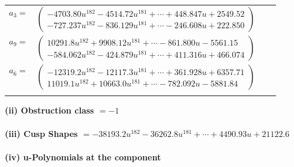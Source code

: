 \documentclass[1p]{elsarticle_modified}
\theoremstyle{definition}
\begin{document}
\begin{tabular}{m{7pt} m{180pt} m{7pt} m{180pt} }
\flushright $a_{3}=$&$\begin{pmatrix}-4703.80 u^{182}-4514.72 u^{181}+\cdots+448.847 u+2549.52\\-727.237 u^{182}-836.129 u^{181}+\cdots-246.608 u+222.850\end{pmatrix}$ \\
\flushright $a_{9}=$&$\begin{pmatrix}10291.8 u^{182}+9908.12 u^{181}+\cdots-861.800 u-5561.15\\-584.062 u^{182}-424.879 u^{181}+\cdots+411.316 u+466.074\end{pmatrix}$ \\
\flushright $a_{6}=$&$\begin{pmatrix}-12319.2 u^{182}-12117.3 u^{181}+\cdots+361.928 u+6357.71\\11019.1 u^{182}+10663.0 u^{181}+\cdots-782.092 u-5881.84\end{pmatrix}$\\&\end{tabular}
\flushleft \textbf{(ii) Obstruction class $= -1$}\\~\\
\flushleft \textbf{(iii) Cusp Shapes $= -38193.2 u^{182}-36262.8 u^{181}+\cdots+4490.93 u+21122.6$}\\~\\
\newpage\renewcommand{\arraystretch}{1}
\flushleft \textbf{(iv) u-Polynomials at the component}\newline \\
\end{document}
